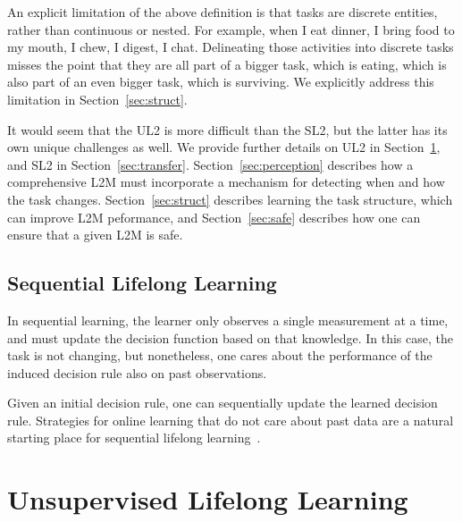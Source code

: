 \documentclass{article}
\begin{document}
An explicit limitation of the above definition is that tasks are discrete entities, rather than continuous or nested.  For example, when I eat dinner, I bring food to my mouth, I chew, I digest, I chat.  Delineating those activities into discrete tasks misses the point that they are all part of a bigger task, which is eating, which is also part of an even bigger task, which is surviving.  We  explicitly address this limitation in Section~\ref{sec:struct}.



It would seem that the UL2 is more difficult than the SL2, but the latter has its own unique challenges as well. We provide further details on UL2  in Section~\ref{sec:continual}, and SL2 in Section~\ref{sec:transfer}.  
Section~\ref{sec:perception} describes how a comprehensive L2M must incorporate a mechanism for detecting when and how the task changes.  Section~\ref{sec:struct} describes learning the task structure, which can improve L2M peformance, and Section~\ref{sec:safe} describes how one can ensure that a given L2M is safe.  



 


\subsection{Sequential Lifelong Learning}
\label{sec:constant}

In sequential learning, the learner only observes a single measurement at a time, and must update the decision function based on that knowledge.  In this case, the task is not changing, but nonetheless, one cares about the performance of the induced decision rule also on past observations.
 
Given an initial decision rule,  one can sequentially update the learned decision rule. Strategies for online learning that do not care about past data are a natural starting place for sequential lifelong learning~\cite{Xiao2010-gv}.





\section{Unsupervised Lifelong Learning}
\label{sec:continual}
\end{document}

